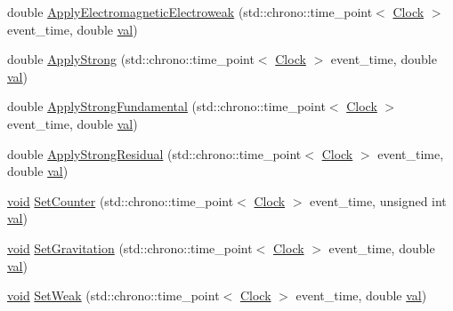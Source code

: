\begin{DoxyCompactItemize}
\item 
double \mbox{\hyperlink{class_composite_force_particle_a5f6aef9e15e2e5f346c7ede76ae6458b}{Apply\+Electromagnetic\+Electroweak}} (std\+::chrono\+::time\+\_\+point$<$ \mbox{\hyperlink{universe_8h_a0ef8d951d1ca5ab3cfaf7ab4c7a6fd80}{Clock}} $>$ event\+\_\+time, double \mbox{\hyperlink{glad_8h_a26942fd2ed566ef553eae82d2c109c8f}{val}})
\item 
double \mbox{\hyperlink{class_composite_force_particle_ac1464a04fbbca2d8927dfdbef0429878}{Apply\+Strong}} (std\+::chrono\+::time\+\_\+point$<$ \mbox{\hyperlink{universe_8h_a0ef8d951d1ca5ab3cfaf7ab4c7a6fd80}{Clock}} $>$ event\+\_\+time, double \mbox{\hyperlink{glad_8h_a26942fd2ed566ef553eae82d2c109c8f}{val}})
\item 
double \mbox{\hyperlink{class_composite_force_particle_a64fe19ee12d6ca0a69f650faa5bedb58}{Apply\+Strong\+Fundamental}} (std\+::chrono\+::time\+\_\+point$<$ \mbox{\hyperlink{universe_8h_a0ef8d951d1ca5ab3cfaf7ab4c7a6fd80}{Clock}} $>$ event\+\_\+time, double \mbox{\hyperlink{glad_8h_a26942fd2ed566ef553eae82d2c109c8f}{val}})
\item 
double \mbox{\hyperlink{class_composite_force_particle_ae0937405e68dd40b19036d5a359f7e07}{Apply\+Strong\+Residual}} (std\+::chrono\+::time\+\_\+point$<$ \mbox{\hyperlink{universe_8h_a0ef8d951d1ca5ab3cfaf7ab4c7a6fd80}{Clock}} $>$ event\+\_\+time, double \mbox{\hyperlink{glad_8h_a26942fd2ed566ef553eae82d2c109c8f}{val}})
\item 
\mbox{\hyperlink{glad_8h_a950fc91edb4504f62f1c577bf4727c29}{void}} \mbox{\hyperlink{class_composite_force_particle_a41cee6bd5a75fbf67fa6e76a9e7d7605}{Set\+Counter}} (std\+::chrono\+::time\+\_\+point$<$ \mbox{\hyperlink{universe_8h_a0ef8d951d1ca5ab3cfaf7ab4c7a6fd80}{Clock}} $>$ event\+\_\+time, unsigned int \mbox{\hyperlink{glad_8h_a26942fd2ed566ef553eae82d2c109c8f}{val}})
\item 
\mbox{\hyperlink{glad_8h_a950fc91edb4504f62f1c577bf4727c29}{void}} \mbox{\hyperlink{class_composite_force_particle_ad9e1553ab0096230edd591e3135b223d}{Set\+Gravitation}} (std\+::chrono\+::time\+\_\+point$<$ \mbox{\hyperlink{universe_8h_a0ef8d951d1ca5ab3cfaf7ab4c7a6fd80}{Clock}} $>$ event\+\_\+time, double \mbox{\hyperlink{glad_8h_a26942fd2ed566ef553eae82d2c109c8f}{val}})
\item 
\mbox{\hyperlink{glad_8h_a950fc91edb4504f62f1c577bf4727c29}{void}} \mbox{\hyperlink{class_composite_force_particle_a7899a6efda98b062051e37c25c214e2a}{Set\+Weak}} (std\+::chrono\+::time\+\_\+point$<$ \mbox{\hyperlink{universe_8h_a0ef8d951d1ca5ab3cfaf7ab4c7a6fd80}{Clock}} $>$ event\+\_\+time, double \mbox{\hyperlink{glad_8h_a26942fd2ed566ef553eae82d2c109c8f}{val}})

\end{DoxyCompactItemize}
